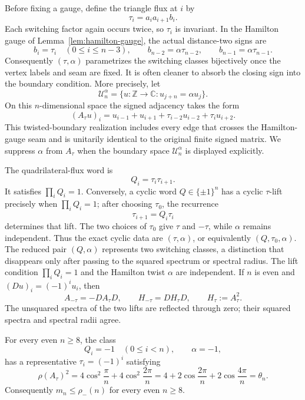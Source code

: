 Before fixing a gauge, define the triangle flux at \(i\) by
\[
\tau_i=a_i a_{i+1}b_i.
\]
Each switching factor again occurs twice, so \(\tau_i\) is invariant.
In the Hamilton gauge of Lemma~\ref{lem:hamilton-gauge}, the actual
distance-two signs are
\[
b_i=\tau_i\quad(0\leq i\leq n-3),\qquad
b_{n-2}=\alpha\tau_{n-2},\qquad
b_{n-1}=\alpha\tau_{n-1}.
\]
Consequently \((\tau,\alpha)\) parametrizes the switching classes
bijectively once the vertex labels and seam are fixed.  It is often cleaner
to absorb the closing sign into the boundary condition.  More precisely, let
\[
\mathcal U_n^\alpha
=\{u:\mathbb Z\to\mathbb C:u_{j+n}=\alpha u_j\}.
\]
On this \(n\)-dimensional space the signed adjacency takes the form
\begin{equation}\label{eq:A-tau}
(A_\tau u)_i
=u_{i-1}+u_{i+1}+\tau_{i-2}u_{i-2}+\tau_i u_{i+2}.
\end{equation}
This twisted-boundary realization includes every edge that crosses the
Hamilton-gauge seam and is unitarily identical to the original finite
signed matrix.  We suppress \(\alpha\) from \(A_\tau\) when the boundary
space \(\mathcal U_n^\alpha\) is displayed explicitly.

The quadrilateral-flux word is
\[
Q_i=\tau_i\tau_{i+1}.
\]
It satisfies \(\prod_iQ_i=1\).  Conversely, a cyclic word
\(Q\in\{\pm1\}^n\) has a cyclic \(\tau\)-lift precisely when
\(\prod_iQ_i=1\); after choosing \(\tau_0\), the recurrence
\[
\tau_{i+1}=Q_i\tau_i
\]
determines that lift.  The two choices of \(\tau_0\) give \(\tau\) and
\(-\tau\), while \(\alpha\) remains independent.  Thus the exact cyclic
data are \((\tau,\alpha)\), or equivalently
\((Q,\tau_0,\alpha)\).  The reduced pair \((Q,\alpha)\) represents two
switching classes, a distinction that disappears only after passing to the
squared spectrum or spectral radius.  The lift condition
\(\prod_iQ_i=1\) and the Hamilton twist \(\alpha\) are independent.  If
\(n\) is even and
\((Du)_i=(-1)^iu_i\), then
\begin{equation}\label{eq:lift-negation}
A_{-\tau}=-DA_\tau D,
\qquad
H_{-\tau}=DH_\tau D,
\qquad H_\tau:=A_\tau^2.
\end{equation}
The unsquared spectra of the two lifts are reflected through zero; their
squared spectra and spectral radii agree.

\begin{proposition}
\label{prop:candidate-attainment}
For every even \(n\geq8\), the class
\[
Q_i=-1\quad(0\leq i<n),\qquad \alpha=-1,
\]
has a representative \(\tau_i=(-1)^i\) satisfying
\[
\rho(A_\tau)^2
=4\cos^2\frac{\pi}{n}+4\cos^2\frac{2\pi}{n}
=4+2\cos\frac{2\pi}{n}+2\cos\frac{4\pi}{n}
=\theta_n.
\]
Consequently \(m_n\leq\rho_-(n)\) for every even \(n\geq8\).
\end{proposition}

